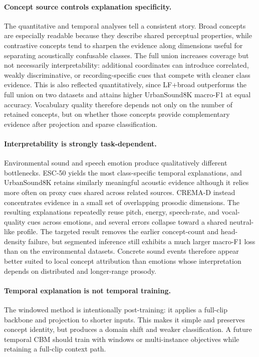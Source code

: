 \documentclass[10pt]{article}
\begin{document}
\paragraph{Concept source controls explanation specificity.}
The quantitative and temporal analyses tell a consistent story. Broad concepts are especially readable because they describe shared perceptual properties, while contrastive concepts tend to sharpen the evidence along dimensions useful for separating acoustically confusable classes. The full union increases coverage but not necessarily interpretability: additional coordinates can introduce correlated, weakly discriminative, or recording-specific cues that compete with cleaner class evidence. This is also reflected quantitatively, since LF+broad outperforms the full union on two datasets and attains higher UrbanSound8K macro-F1 at equal accuracy. Vocabulary quality therefore depends not only on the number of retained concepts, but on whether those concepts provide complementary evidence after projection and sparse classification.

\paragraph{Interpretability is strongly task-dependent.}
Environmental sound and speech emotion produce qualitatively different bottlenecks. ESC-50 yields the most class-specific temporal explanations, and UrbanSound8K retains similarly meaningful acoustic evidence although it relies more often on proxy cues shared across related sources. CREMA-D instead concentrates evidence in a small set of overlapping prosodic dimensions. The resulting explanations repeatedly reuse pitch, energy, speech-rate, and vocal-quality cues across emotions, and several errors collapse toward a shared neutral-like profile. The targeted result removes the earlier concept-count and head-density failure, but segmented inference still exhibits a much larger macro-F1 loss than on the environmental datasets. Concrete sound events therefore appear better suited to local concept attribution than emotions whose interpretation depends on distributed and longer-range prosody.

\paragraph{Temporal explanation is not temporal training.}
The windowed method is intentionally post-training: it applies a full-clip backbone and projection to shorter inputs. This makes it simple and preserves concept identity, but produces a domain shift and weaker classification. A future temporal CBM should train with windows or multi-instance objectives while retaining a full-clip context path.
\end{document}
